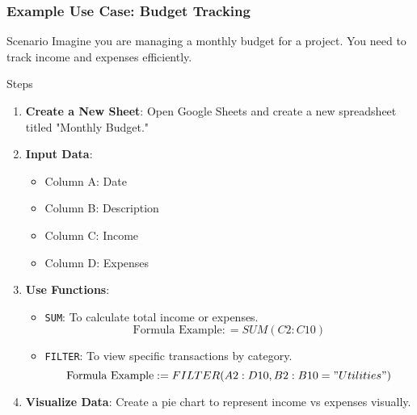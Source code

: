 \documentclass[aspectratio=169]{beamer}
\begin{document}
\begin{frame}[fragile]
    \frametitle{Example Use Case: Budget Tracking}
    \begin{block}{Scenario}
        Imagine you are managing a monthly budget for a project. You need to track income and expenses efficiently.
    \end{block}

    \begin{block}{Steps}
        \begin{enumerate}
            \item \textbf{Create a New Sheet}: Open Google Sheets and create a new spreadsheet titled "Monthly Budget."
            \item \textbf{Input Data}:
                \begin{itemize}
                    \item Column A: Date
                    \item Column B: Description
                    \item Column C: Income
                    \item Column D: Expenses
                \end{itemize}
            \item \textbf{Use Functions}:
                \begin{itemize}
                    \item \texttt{SUM}: To calculate total income or expenses. 
                        \begin{equation}
                        \text{Formula Example}: =SUM(C2:C10)
                        \end{equation}
                    \item \texttt{FILTER}: To view specific transactions by category.
                        \begin{equation}
                        \text{Formula Example}: =FILTER(A2:D10, B2:B10="Utilities")
                        \end{equation}
                \end{itemize}
            \item \textbf{Visualize Data}: Create a pie chart to represent income vs expenses visually.
        \end{enumerate}
    \end{block}

\end{frame}
\end{document}
